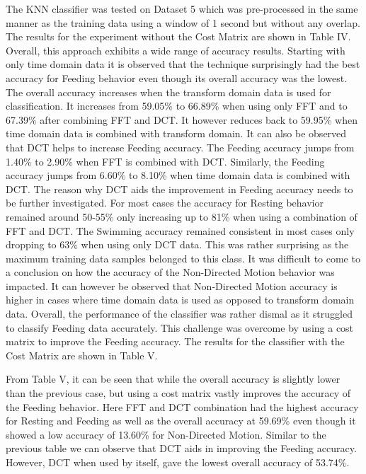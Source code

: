 \documentclass[conference]{IEEEtran}
\begin{document}
The KNN classifier was tested on Dataset 5 which was pre-processed in the same manner as the training data using a window of 1 second but without any overlap. The results for the experiment without the Cost Matrix are shown in Table IV. Overall, this approach exhibits a wide range of accuracy results. Starting with only time domain data it is observed that the technique surprisingly had the best accuracy for Feeding behavior even though its overall accuracy was the lowest. The overall accuracy increases when the transform domain data is used for classification. It increases from 59.05\% to 66.89\% when using only FFT and to 67.39\% after combining FFT and DCT. It however reduces back to 59.95\% when time domain data is combined with transform domain. It can also be observed that DCT helps to increase Feeding accuracy. The Feeding accuracy jumps from 1.40\% to 2.90\% when FFT is combined with DCT. Similarly, the Feeding accuracy jumps from 6.60\% to 8.10\% when time domain data is combined with DCT. The reason why DCT aids the improvement in Feeding accuracy needs to be further investigated. For most cases the accuracy for Resting behavior remained around 50-55\% only increasing up to 81\% when using a combination of FFT and DCT. The Swimming accuracy remained consistent in most cases only dropping to 63\% when using only DCT data. This was rather surprising as the maximum training data samples belonged to this class. It was difficult to come to a conclusion on how the accuracy of the Non-Directed Motion behavior was impacted. It can however be observed that Non-Directed Motion accuracy is higher in cases where time domain data is used as opposed to transform domain data. Overall, the performance of the classifier was rather dismal as it struggled to classify Feeding data accurately. This challenge was overcome by using a cost matrix to improve the Feeding accuracy. The results for the classifier with the Cost Matrix are shown in Table V.

From Table V, it can be seen that while the overall accuracy is slightly lower than the previous case, but using a cost matrix vastly improves the accuracy of the Feeding behavior. Here FFT and DCT combination had the highest accuracy for Resting and Feeding as well as the overall accuracy at 59.69\% even though it showed a low accuracy of 13.60\% for Non-Directed Motion. Similar to the previous table we can observe that DCT aids in improving the Feeding accuracy. However, DCT when used by  itself,  gave the lowest overall accuracy of 53.74\%. 
\end{document}
